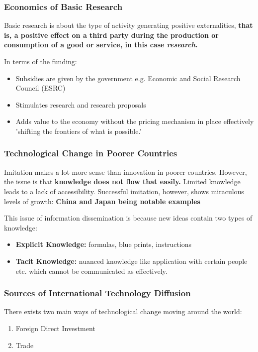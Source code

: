 \documentclass[12pt, letterpaper]{article}
\begin{document}
\subsubsection{Economics of Basic Research}
Basic research is about the type of activity generating positive externalities, \textbf{that is, a positive effect on a third party during the production or consumption of a good or service, in this case \textit{research}.}

In terms of the funding:
\begin{itemize}
	\item Subsidies are given by the government e.g. Economic and Social Research Council (ESRC)
	\item Stimulates research and research proposals
	\item Adds value to the economy without the pricing mechanism in place effectively 'shifting the frontiers of what is possible.'
\end{itemize}

\subsubsection{Technological Change in Poorer Countries}
Imitation makes a lot more sense than innovation in poorer countries. However, the issue is that \textbf{knowledge does not flow that easily.} Limited knowledge leads to a lack of accessibility. Successful imitation, however, shows miraculous levels of growth: \textbf{China and Japan being notable examples}

This issue of information dissemination is because new ideas contain two types of knowledge:
\begin{itemize}
	\item \textbf{Explicit Knowledge:} formulas, blue prints, instructions
	\item \textbf{Tacit Knowledge:} nuanced knowledge like application with certain people etc. which cannot be communicated as effectively.
\end{itemize}

\subsubsection{Sources of International Technology Diffusion}
There exists two main ways of technological change moving around the world:
\begin{enumerate}
	\item Foreign Direct Investment
	\item Trade
\end{enumerate}
\end{document}
